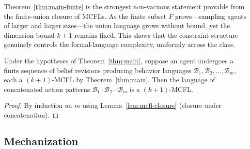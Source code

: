 \documentclass[runningheads]{llncs}
\begin{document}
\begin{remark}\label{rem:finite-subclass}
Theorem~\ref{thm:main-finite} is the strongest non-vacuous statement provable from the finite-union closure of MCFLs.
As the finite subset $F$ grows---sampling agents of larger and larger sizes---the union language grows without bound, yet the dimension bound $k+1$ remains fixed.
This shows that the constraint structure genuinely controls the formal-language complexity, uniformly across the class.
\end{remark}

\begin{corollary}\label{cor:temporal}
Under the hypotheses of Theorem~\ref{thm:main}, suppose an agent undergoes a finite sequence of belief revisions producing behavior languages $\mathcal{B}_1, \mathcal{B}_2, \ldots, \mathcal{B}_m$, each a $(k{+}1)$-MCFL by Theorem~\ref{thm:main}.
Then the language of concatenated action patterns $\mathcal{B}_1 \cdot \mathcal{B}_2 \cdots \mathcal{B}_m$ is a $(k{+}1)$-MCFL.
\end{corollary}

\begin{proof}
By induction on $m$ using Lemma~\ref{lem:mcfl-closure} (closure under concatenation).
\end{proof}

\subsection{Mechanization}\label{sec:mechanization}
\end{document}
